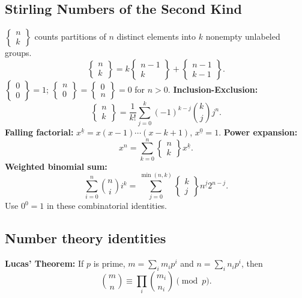 \documentclass[portrait, 8pt, a4paper, oneside, twocolumn]{extarticle}
\begin{document}
\subsection{Stirling Numbers of the Second Kind}
$\left\{\begin{smallmatrix}n\\k\end{smallmatrix}\right\}$ counts partitions of $n$ distinct elements into $k$ nonempty unlabeled groups.
\[
\left\{\begin{matrix}n\\k\end{matrix}\right\}
=k\left\{\begin{matrix}n-1\\k\end{matrix}\right\}
+\left\{\begin{matrix}n-1\\k-1\end{matrix}\right\}.
\]
$\left\{\begin{smallmatrix}0\\0\end{smallmatrix}\right\}=1$;
$\left\{\begin{smallmatrix}n\\0\end{smallmatrix}\right\}
=\left\{\begin{smallmatrix}0\\n\end{smallmatrix}\right\}=0$ for $n>0$.
\textbf{Inclusion-Exclusion:}
\[
\left\{\begin{matrix}n\\k\end{matrix}\right\}
=\frac1{k!}\sum_{j=0}^{k}(-1)^{k-j}\binom{k}{j}j^n.
\]
\textbf{Falling factorial:}
$x^{\underline{k}}=x(x-1)\cdots(x-k+1)$, $x^{\underline0}=1$.
\textbf{Power expansion:}
\[
x^n=\sum_{k=0}^{n}
\left\{\begin{matrix}n\\k\end{matrix}\right\}x^{\underline{k}}.
\]
\textbf{Weighted binomial sum:}
\[
\sum_{i=0}^{n}\binom{n}{i}i^k
=\sum_{j=0}^{\min(n,k)}
\left\{\begin{matrix}k\\j\end{matrix}\right\}
n^{\underline j}2^{n-j}.
\]
Use $0^0=1$ in these combinatorial identities.

\subsection{Number theory identities}
\textbf{Lucas' Theorem:} If $p$ is prime,
$m=\sum_i m_ip^i$ and $n=\sum_i n_ip^i$, then
\[
\binom{m}{n}\equiv\prod_i\binom{m_i}{n_i}\pmod p.
\]
\end{document}
